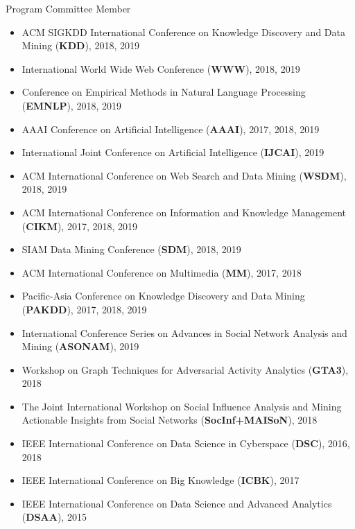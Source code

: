 \documentclass[margin, 9pt]{res}
\begin{document}
\begin{resume}
{Program Committee Member}
\begin{itemize}
\item ACM SIGKDD International Conference on Knowledge Discovery and Data Mining (\textbf{KDD}), 2018, 2019
\item International World Wide Web Conference (\textbf{WWW}), 2018, 2019
\item Conference on Empirical Methods in Natural Language Processing (\textbf{EMNLP}), 2018, 2019
\item AAAI Conference on Artificial Intelligence (\textbf{AAAI}), 2017, 2018, 2019
\item International Joint Conference on Artificial Intelligence (\textbf{IJCAI}), 2019
\item ACM International Conference on Web Search and Data Mining (\textbf{WSDM}), 2018, 2019
\item ACM International Conference on Information and Knowledge Management (\textbf{CIKM}), 2017, 2018, 2019
\item SIAM Data Mining Conference (\textbf{SDM}), 2018, 2019
\item ACM International Conference on Multimedia (\textbf{MM}), 2017, 2018	
\item Pacific-Asia Conference on Knowledge Discovery and Data Mining (\textbf{PAKDD}), 2017, 2018, 2019
\item International Conference Series on Advances in Social Network Analysis and Mining (\textbf{ASONAM}), 2019
\item Workshop on Graph Techniques for Adversarial Activity Analytics (\textbf{GTA3}), 2018
\item The Joint International Workshop on Social Influence Analysis and Mining Actionable Insights from Social Networks (\textbf{SocInf+MAISoN}), 2018
\item IEEE International Conference on Data Science in Cyberspace (\textbf{DSC}), 2016, 2018
\item IEEE International Conference on Big Knowledge (\textbf{ICBK}), 2017
\item IEEE International Conference on Data Science and Advanced Analytics (\textbf{DSAA}), 2015
\end{itemize}
\vspace{-0.1in}


\end{resume}
\end{document}
